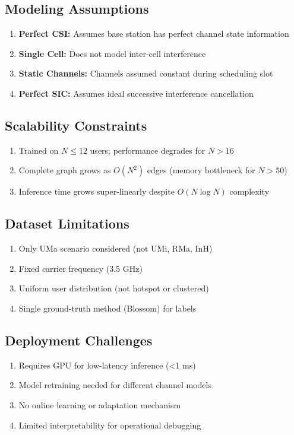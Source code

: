 \subsection{Modeling Assumptions}
\begin{enumerate}
    \item \textbf{Perfect CSI:} Assumes base station has perfect channel state information
    \item \textbf{Single Cell:} Does not model inter-cell interference
    \item \textbf{Static Channels:} Channels assumed constant during scheduling slot
    \item \textbf{Perfect SIC:} Assumes ideal successive interference cancellation
\end{enumerate}

\subsection{Scalability Constraints}
\begin{enumerate}
    \item Trained on $N \leq 12$ users; performance degrades for $N > 16$
    \item Complete graph grows as $O(N^2)$ edges (memory bottleneck for $N > 50$)
    \item Inference time grows super-linearly despite $O(N \log N)$ complexity
\end{enumerate}

\subsection{Dataset Limitations}
\begin{enumerate}
    \item Only UMa scenario considered (not UMi, RMa, InH)
    \item Fixed carrier frequency (3.5 GHz)
    \item Uniform user distribution (not hotspot or clustered)
    \item Single ground-truth method (Blossom) for labels
\end{enumerate}

\subsection{Deployment Challenges}
\begin{enumerate}
    \item Requires GPU for low-latency inference (<1 ms)
    \item Model retraining needed for different channel models
    \item No online learning or adaptation mechanism
    \item Limited interpretability for operational debugging
\end{enumerate}

